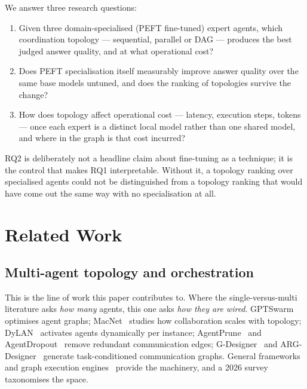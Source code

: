 \documentclass[journal,10pt,compsoc,onecolumn]{IEEEtran}
\begin{document}
We answer three research questions:
\begin{enumerate}
\item[\textbf{RQ1}] Given three domain-specialised (PEFT fine-tuned) expert
agents, which coordination topology --- sequential, parallel or DAG --- produces
the best judged answer quality, and at what operational cost?
\item[\textbf{RQ2}] Does PEFT specialisation itself measurably improve answer
quality over the same base models untuned, and does the ranking of topologies
survive the change?
\item[\textbf{RQ3}] How does topology affect operational cost --- latency,
execution steps, tokens --- once each expert is a distinct local model rather
than one shared model, and where in the graph is that cost incurred?
\end{enumerate}

RQ2 is deliberately not a headline claim about fine-tuning as a technique; it is
the control that makes RQ1 interpretable. Without it, a topology ranking over
specialised agents could not be distinguished from a topology ranking that would
have come out the same way with no specialisation at all.

\section{Related Work}

\subsection{Multi-agent topology and orchestration}
This is the line of work this paper contributes to. Where the
single-versus-multi literature asks \emph{how many} agents, this one asks
\emph{how they are wired}. GPTSwarm~\cite{zhuge2024gptswarm} optimises agent
graphs; MacNet~\cite{qian2024macnet} studies how collaboration scales with
topology; DyLAN~\cite{liu2023dylan} activates agents dynamically per instance;
AgentPrune~\cite{zhang2024agentprune} and AgentDropout~\cite{wang2025agentdropout}
remove redundant communication edges; G-Designer~\cite{zhang2024gdesigner} and
ARG-Designer~\cite{li2025argdesigner} generate task-conditioned communication
graphs. General frameworks~\cite{wu2023autogen, hong2023metagpt, li2023camel} and
graph execution engines~\cite{langchain2024langgraph} provide the machinery, and a
2026 survey~\cite{zhu2026masorchestrationsurvey} taxonomises the space.
\end{document}
